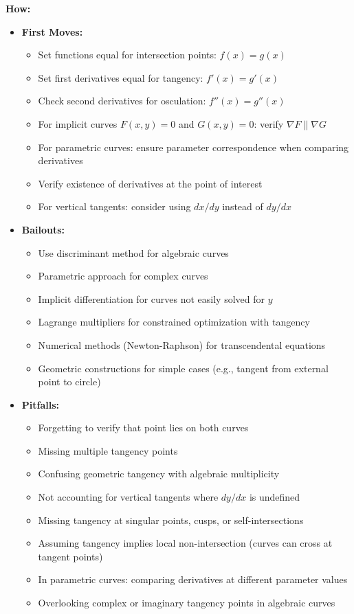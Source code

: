 \documentclass[12pt]{article}
\begin{document}
\textbf{How:}
\begin{itemize}
    \item \textbf{First Moves:} 
    \begin{itemize}
        \item Set functions equal for intersection points: $f(x) = g(x)$
        \item Set first derivatives equal for tangency: $f'(x) = g'(x)$
        \item Check second derivatives for osculation: $f''(x) = g''(x)$
        \item For implicit curves $F(x,y) = 0$ and $G(x,y) = 0$: verify $\nabla F \parallel \nabla G$
        \item For parametric curves: ensure parameter correspondence when comparing derivatives
        \item Verify existence of derivatives at the point of interest
        \item For vertical tangents: consider using $dx/dy$ instead of $dy/dx$
    \end{itemize}
    
    \item \textbf{Bailouts:}
    \begin{itemize}
        \item Use discriminant method for algebraic curves
        \item Parametric approach for complex curves
        \item Implicit differentiation for curves not easily solved for $y$
        \item Lagrange multipliers for constrained optimization with tangency
        \item Numerical methods (Newton-Raphson) for transcendental equations
        \item Geometric constructions for simple cases (e.g., tangent from external point to circle)
    \end{itemize}
    
    \item \textbf{Pitfalls:}
    \begin{itemize}
        \item Forgetting to verify that point lies on both curves
        \item Missing multiple tangency points
        \item Confusing geometric tangency with algebraic multiplicity
        \item Not accounting for vertical tangents where $dy/dx$ is undefined
        \item Missing tangency at singular points, cusps, or self-intersections
        \item Assuming tangency implies local non-intersection (curves can cross at tangent points)
        \item In parametric curves: comparing derivatives at different parameter values
        \item Overlooking complex or imaginary tangency points in algebraic curves
    \end{itemize}
\end{itemize}
\end{document}

